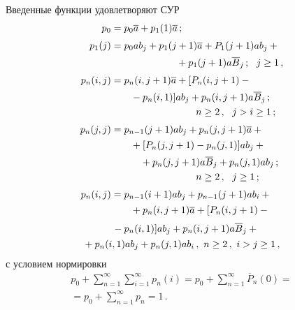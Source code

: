 \begin{multicols}{2}
Введенные функции удовлетворяют СУР
\begin{align}
p_{0} &= p_{0} \a + p_{1}(1) \a\,;\label{e25p}\\[3pt]
p_{1}(j) &  = p_{0} a b_j + p_{1}(j+1) \a + P_{1}(j+1) a b_j +{}\notag\\[1pt]
&\hspace*{40pt}\ \ \ \ \ \ \ \ {}+
p_{1}(j+1) a \overline B_j\,;  \ \ j\ge 1\,,\label{e26p}\\[3pt]
p_{n}(i,j) & = p_{n}(i,j+1) \a + [P_n(i,j+1) -{}\notag\\[1pt]
&\hspace*{20pt}{}- p_{n}(i,1)] a b_j  +
p_{n}(i,j+1) a \overline B_j\,;\notag\\
&\hspace*{40pt}\ \ \ \ \ \ \ \ \ \ \ \ \ \ n\ge 2\,,\ \ j>i\ge 1\,;\label{e27p}\\[3pt]
p_{n}(j,j) & = p_{n-1}(j+1) a b_j + p_{n}(j,j+1) \a +{}\notag\\[1pt]
&\hspace*{20pt}{}+[P_n(j,j+1) - p_{n}(j,1)] a b_j +{}\notag\\[1pt]
&\hspace*{30pt}{}+ p_{n}(j,j+1) a \overline B_j +
p_n(j,1)ab_j\,;\notag\\
&\hspace*{40pt}\ \ \ \ \ \ \ \ \ \ \ \  \ \ n\ge 2\,,\ \ j\ge 1\,; \label{e28p}\\[3pt]
p_{n}(i,j) & = p_{n-1}(i+1) a b_j + p_{n-1}(j+1) a b_i +{}\notag\\[1pt]
&\hspace*{20pt}{}+p_{n}(i,j+1) \a + [P_n(i,j+1) - {}\notag %
\end{align}
\begin{align}
&\hspace*{30pt}{}-p_{n}(i,1)] a b_j +
p_{n}(i,j+1) a \overline B_j +{}\notag\\[1pt]
&{}+ p_n(i,1)ab_j +
p_n(j,1)ab_i\,, \  n\ge 2\,,\  i>j\ge 1\,, \label{e29p}
\end{align}
с условием нормировки
\begin{multline}
p_0 + \sum\limits_{n=1}^\infty
\sum\limits_{i=1}^\infty p_n(i)
= p_0 + \sum\limits_{n=1}^\infty \overline P_{n}(0)
=\\
{}= p_0 + \sum\limits_{n=1}^\infty p_{n} = 1\,.
\label{e30p}
\end{multline}


\end{multicols}
